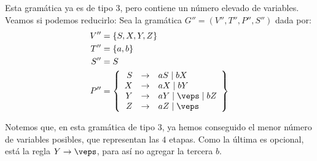 \begin{ejercicio}
\begin{enumerate}
        Esta gramática ya es de tipo $3$, pero contiene un número elevado de variables. Veamos si podemos reducirlo:
        Sea la gramática $G''=\left(V'',T'',P'',S''\right)$ dada por:
        \begin{align*}
            V'' &= \{S, X,Y,Z\} \\
            T'' &= \{a,b\} \\
            S'' &= S \\
            P'' &= \left\{
                \begin{array}{rcl}
                    S &\rightarrow & aS \mid bX \\
                    X &\rightarrow & aX \mid bY \\
                    Y &\rightarrow & aY \mid \veps \mid bZ \\
                    Z &\rightarrow & aZ \mid \veps
                \end{array}
            \right\}
        \end{align*}

        Notemos que, en esta gramática de tipo $3$, ya hemos conseguido el menor número de variables posibles, que representan las $4$ etapas. Como la última es opcional, está la regla $Y\rightarrow \veps$, para así no agregar la tercera $b$.

    \end{enumerate}
\end{ejercicio}

